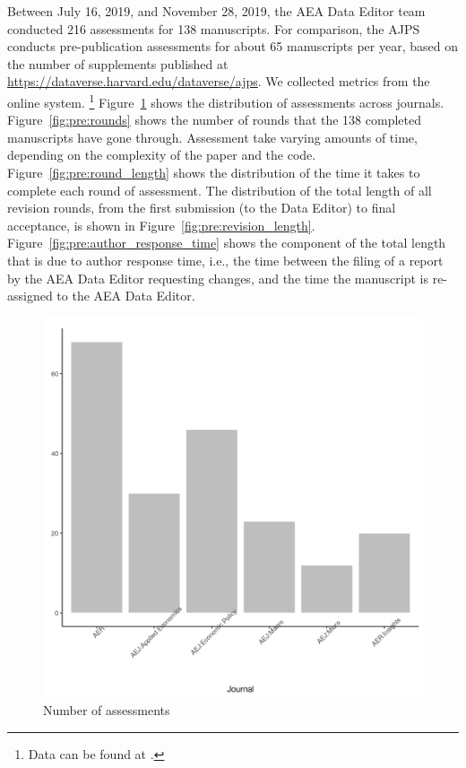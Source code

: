 \documentclass[PP]{AEA}
\begin{document}
\newcommand{\jiratickets}{216}
\newcommand{\jiramcs}{138}

Between July 16, 2019, and November 28, 2019, the AEA Data Editor team conducted 
\jiratickets{} assessments for \jiramcs{} manuscripts.
For comparison, the \ac{AJPS} conducts pre-publication assessments for about 65 manuscripts per year, based on the number of supplements published at \url{https://dataverse.harvard.edu/dataverse/ajps}.
%
We collected metrics from the online system.%
\footnote{Data  can be found at \citet{E117876V1}.}
Figure~\ref{fig:pre:assessments_journal} shows the distribution of  assessments across journals. Figure~\ref{fig:pre:rounds} shows the number of rounds that the \jiramcs{} completed manuscripts have gone through. Assessment take varying amounts of time, depending on the complexity of the paper and the code. Figure~\ref{fig:pre:round_length} shows the distribution of the time it takes to complete each round of assessment. The distribution of the total length of all revision rounds, from the first submission (to the Data Editor) to final acceptance, is shown in Figure~\ref{fig:pre:revision_length}. Figure~\ref{fig:pre:author_response_time} shows the component of the total length that is due to author response time, i.e., the time between the filing of a report by the AEA Data Editor requesting changes, and the time the manuscript is re-assigned to the AEA Data Editor. 

\begin{figure}
    \centering
    \includegraphics[height=0.4\textheight]{images/n_assessments_journal_plot.png}
    \caption{Number of assessments}
    \label{fig:pre:assessments_journal}
\end{figure}
\end{document}
